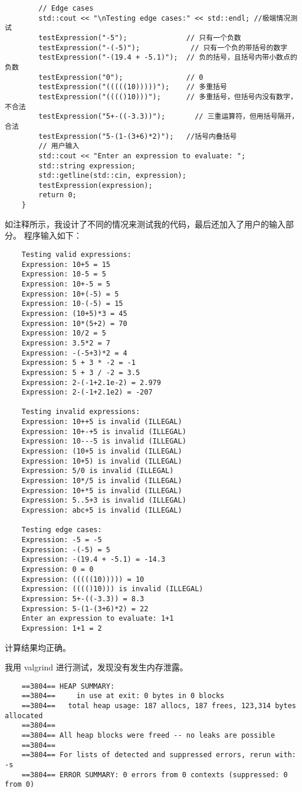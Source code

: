 \documentclass[UTF8]{ctexart}
\begin{document}
\begin{lstlisting}
        // Edge cases
        std::cout << "\nTesting edge cases:" << std::endl; //极端情况测试
        testExpression("-5");              // 只有一个负数
        testExpression("-(-5)");            // 只有一个负的带括号的数字
        testExpression("-(19.4 + -5.1)");  // 负的括号，且括号内带小数点的负数
        testExpression("0");               // 0
        testExpression("(((((10)))))");    // 多重括号
        testExpression("(((()10)))");      // 多重括号，但括号内没有数字，不合法
        testExpression("5+-((-3.3))");       // 三重运算符，但用括号隔开，合法
        testExpression("5-(1-(3+6)*2)");   //括号内叠括号
        // 用户输入
        std::cout << "Enter an expression to evaluate: ";
        std::string expression;
        std::getline(std::cin, expression);
        testExpression(expression);
        return 0;
    }    
\end{lstlisting}\par
如注释所示，我设计了不同的情况来测试我的代码，最后还加入了用户的输入部分。
程序输入如下：
\begin{lstlisting}
    Testing valid expressions:
    Expression: 10+5 = 15
    Expression: 10-5 = 5
    Expression: 10+-5 = 5
    Expression: 10+(-5) = 5
    Expression: 10-(-5) = 15
    Expression: (10+5)*3 = 45
    Expression: 10*(5+2) = 70
    Expression: 10/2 = 5
    Expression: 3.5*2 = 7
    Expression: -(-5+3)*2 = 4
    Expression: 5 + 3 * -2 = -1
    Expression: 5 + 3 / -2 = 3.5
    Expression: 2-(-1+2.1e-2) = 2.979
    Expression: 2-(-1+2.1e2) = -207
    
    Testing invalid expressions:
    Expression: 10++5 is invalid (ILLEGAL)
    Expression: 10+-+5 is invalid (ILLEGAL)
    Expression: 10---5 is invalid (ILLEGAL)
    Expression: (10+5 is invalid (ILLEGAL)
    Expression: 10+5) is invalid (ILLEGAL)
    Expression: 5/0 is invalid (ILLEGAL)
    Expression: 10*/5 is invalid (ILLEGAL)
    Expression: 10+*5 is invalid (ILLEGAL)
    Expression: 5..5+3 is invalid (ILLEGAL)
    Expression: abc+5 is invalid (ILLEGAL)
    
    Testing edge cases:
    Expression: -5 = -5
    Expression: -(-5) = 5
    Expression: -(19.4 + -5.1) = -14.3
    Expression: 0 = 0
    Expression: (((((10))))) = 10
    Expression: (((()10))) is invalid (ILLEGAL)
    Expression: 5+-((-3.3)) = 8.3
    Expression: 5-(1-(3+6)*2) = 22
    Enter an expression to evaluate: 1+1
    Expression: 1+1 = 2
\end{lstlisting}\par
计算结果均正确。\par
我用 valgrind 进行测试，发现没有发生内存泄露。
\begin{lstlisting}
    ==3804== HEAP SUMMARY:
    ==3804==     in use at exit: 0 bytes in 0 blocks
    ==3804==   total heap usage: 187 allocs, 187 frees, 123,314 bytes allocated
    ==3804== 
    ==3804== All heap blocks were freed -- no leaks are possible
    ==3804== 
    ==3804== For lists of detected and suppressed errors, rerun with: -s
    ==3804== ERROR SUMMARY: 0 errors from 0 contexts (suppressed: 0 from 0)    
\end{lstlisting}
\end{document}
